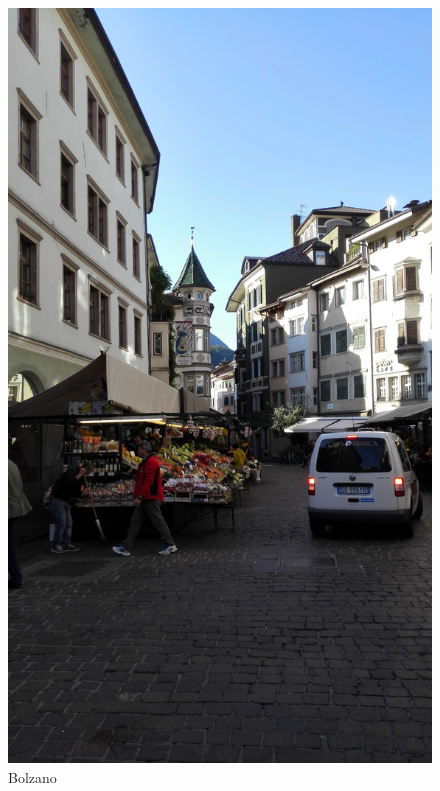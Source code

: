 \begin{figure}[ht]%
 	\begin{center}%
 		\includegraphics[scale=0.05]{img/Bolzano.jpg}%
 		\caption{Bolzano}\label{fig:culture2}%
 	\end{center}%
\end{figure} 

